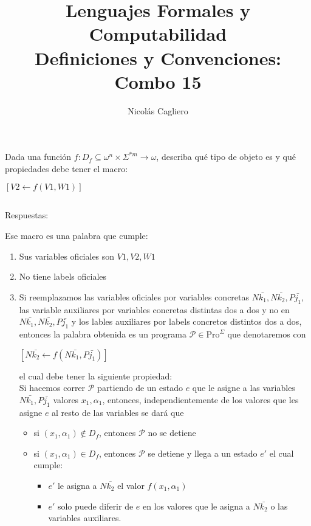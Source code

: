 \documentclass{article}
\title{Lenguajes Formales y Computabilidad \\
        \large Definiciones y Convenciones: Combo 15 }
\author{Nicolás Cagliero}
\begin{document}
\maketitle

Dada una función $f : D_f \subseteq \omega^n \times \Sigma^{*m} \rightarrow \omega$,
describa qué tipo de objeto es y qué propiedades debe tener el macro:
\begin{center}
    $[V2 \leftarrow f(V1, W1)]$
\end{center}

\(\)
\begin{center}
    Respuestas: 
    \(\)
\end{center}

Ese macro es una palabra que cumple:
\begin{enumerate}
    \item Sus variables oficiales son $V1, V2, W1$
    \item No tiene labels oficiales
    \item Si reemplazamos las variables oficiales por variables concretas
    $N \bar{k_1}, N \bar{k_2}, P \bar{j_1}$, las variable auxiliares por 
    variables concretas distintas dos a dos y no en 
    $N \bar{k_1}, N \bar{k_2}, P \bar{j_1}$ y los lables auxiliares 
    por labels concretos distintos dos a dos, entonces la palabra obtenida 
    es un programa $\mathcal{P} \in \text{Pro}^{\Sigma}$ que denotaremos
    con 
    \begin{center}
        $[N \bar{k_2} \leftarrow f( N \bar{k_1}, P \bar{j_1})]$
    \end{center}
    el cual debe tener la siguiente propiedad:\\
    Si hacemos correr $\mathcal{P}$ partiendo de un estado $e$ que le asigne a las variables 
$N \bar{k_1}, P \bar{j_1}$ 
valores $x_1, \alpha_1$, entonces, independientemente de los valores que les asigne $e$ al resto de las variables 
se dará que

    \begin{itemize}
        \item si $(x_1, \alpha_1) \notin D_f$, entonces $\mathcal{P}$ no se detiene
        \item si $(x_1, \alpha_1) \in D_f$, entonces $\mathcal{P}$ se detiene y llega a un estado $e'$ el cual cumple:
        \begin{itemize}
            \item $e'$ le asigna a $N \bar{k_2}$ el valor $f(x_1, \alpha_1)$
            \item $e'$ solo puede diferir de $e$ en los valores que le asigna a $N \bar{k_2}$ o 
            las variables auxiliares.
        \end{itemize}
    \end{itemize}

\end{enumerate}
\end{document}
